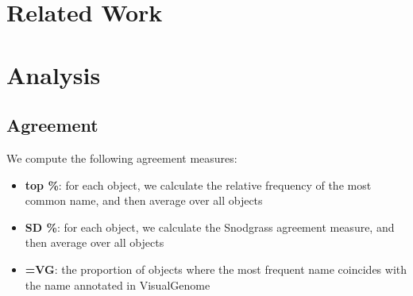 \documentclass[11pt,a4paper]{article}
\begin{document}
%

\section{Related Work}

\section{Analysis}

\subsection{Agreement}

We compute the following agreement measures:

\begin{itemize}
\item \textbf{top \%}: for each object, we calculate the relative frequency of the most common name, and then average over all objects
\item \textbf{SD \%}: for each object, we calculate the Snodgrass agreement measure, and then average over all objects
\item \textbf{=VG}: the proportion of objects where the most frequent name coincides with the name annotated in VisualGenome
\end{itemize}
\end{document}
